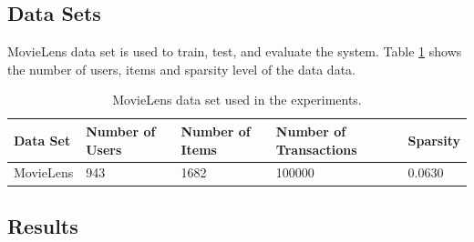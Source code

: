 \documentclass[conference]{IEEEtran}
\begin{document}
\subsection{Data Sets}
MovieLens data set is used to train, test, and evaluate the system. Table 
\ref{table:data-set} shows the number of users, items and sparsity level of 
the data data.

\begin{table}[!ht]
\centering
\begin{tabularx}{0.45\textwidth}{XXXXX}
\hline
Data Set & Number of \newline Users & Number of \newline Items & Number of \newline Transactions & Sparsity \\
\hline
MovieLens     & 943	& 1682	  & 100000   & 0.0630   \\
\hline
\end{tabularx}
\caption{MovieLens data set used in the experiments.}
\label{table:data-set}
\end{table}


\subsection{Results}
\end{document}
